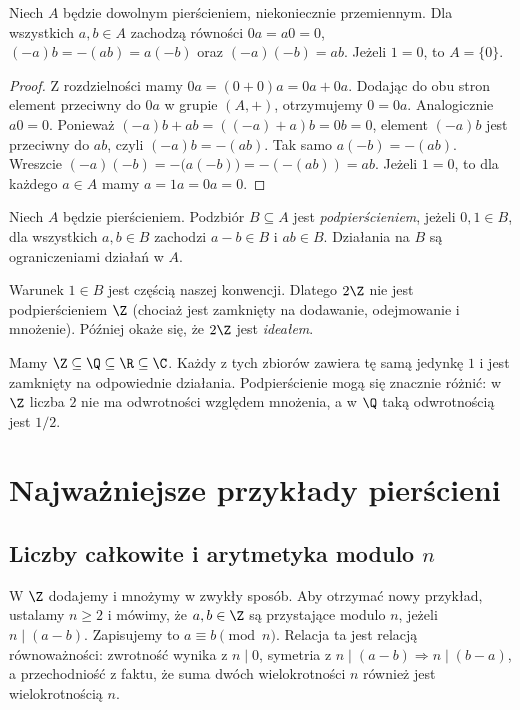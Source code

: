 \begin{lemat}
\label{lem:reguly}
Niech $A$ będzie dowolnym pierścieniem, niekoniecznie przemiennym.
Dla wszystkich $a,b\in A$ zachodzą równości
$0a=a0=0$, $(-a)b=-(ab)=a(-b)$ oraz $(-a)(-b)=ab$.
Jeżeli $1=0$, to $A=\{0\}$.
\end{lemat}
\begin{proof}
Z rozdzielności mamy $0a=(0+0)a=0a+0a$.
Dodając do obu stron element przeciwny do $0a$ w grupie $(A,+)$,
otrzymujemy $0=0a$. Analogicznie $a0=0$.
Ponieważ $(-a)b+ab=((-a)+a)b=0b=0$, element $(-a)b$ jest przeciwny
do $ab$, czyli $(-a)b=-(ab)$. Tak samo $a(-b)=-(ab)$.
Wreszcie $(-a)(-b)=-\bigl(a(-b)\bigr)=-(-(ab))=ab$.
Jeżeli $1=0$, to dla każdego $a\in A$ mamy $a=1a=0a=0$.
\end{proof}

\begin{definicja}[Podpierścień]
Niech $A$ będzie pierścieniem. Podzbiór $B\subseteq A$ jest
\emph{podpierścieniem}, jeżeli $0,1\in B$, dla wszystkich $a,b\in B$
zachodzi $a-b\in B$ i $ab\in B$. Działania na $B$ są ograniczeniami
działań w $A$.
\end{definicja}

Warunek $1\in B$ jest częścią naszej konwencji. Dlatego $2\Z$ nie jest
podpierścieniem $\Z$ (chociaż jest zamknięty na dodawanie, odejmowanie
i mnożenie). Później okaże się, że $2\Z$ jest \emph{ideałem}.

\begin{przyklad}
Mamy $\Z\subseteq\Q\subseteq\R\subseteq\C$.
Każdy z tych zbiorów zawiera tę samą jedynkę $1$ i jest zamknięty
na odpowiednie działania. Podpierścienie mogą się znacznie różnić:
w $\Z$ liczba $2$ nie ma odwrotności względem mnożenia,
a w $\Q$ taką odwrotnością jest $1/2$.
\end{przyklad}

\section{Najważniejsze przykłady pierścieni}

\subsection{Liczby całkowite i arytmetyka modulo \texorpdfstring{$n$}{n}}

W $\Z$ dodajemy i mnożymy w zwykły sposób. Aby otrzymać nowy przykład,
ustalamy $n\ge2$ i mówimy, że $a,b\in\Z$ są przystające modulo $n$,
jeżeli $n\mid(a-b)$. Zapisujemy to $a\equiv b\pmod n$.
Relacja ta jest relacją równoważności: zwrotność wynika z $n\mid0$,
symetria z $n\mid(a-b)\Rightarrow n\mid(b-a)$,
a przechodniość z faktu, że suma dwóch wielokrotności $n$
również jest wielokrotnością $n$.

